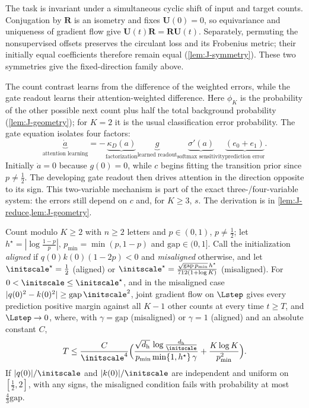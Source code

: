 The task is invariant under a simultaneous cyclic shift of input and target counts. Conjugation by $\mathbf R$ is an isometry
and fixes $\mathbf U(0)=0$, so equivariance and uniqueness of gradient flow give $\mathbf U(t)\mathbf R=\mathbf R\mathbf U(t)$.
Separately, permuting the nonsupervised offsets preserves the circulant loss and its Frobenius metric; their initially equal
coefficients therefore remain equal (\cref{lem:J-symmetry}). These two symmetries give the fixed-direction family above.

The count contrast learns from the difference of the weighted errors, while the gate readout learns their attention-weighted
difference. Here $\phi_K$ is the probability of the other possible next count plus half the total background probability
(\cref{lem:J-geometry}); for $K=2$ it is the usual classification error probability. The gate equation isolates four factors:
\[
 \boxed{\underbrace{\dot a}_{\text{attention learning}}
 =-\underbrace{\kappa_D(a)}_{\text{factorization}}
 \underbrace{g}_{\text{learned readout}}
 \underbrace{\sigma'(a)}_{\text{softmax sensitivity}}
 \underbrace{(e_0+e_1)}_{\text{prediction error}}.}
\]
Initially $\dot a=0$ because $g(0)=0$, while $c$ begins fitting the transition prior since $p\ne\frac12$. The developing gate
readout then drives attention in the direction opposite to its sign. This two-variable mechanism is part of the exact
three-/four-variable system: the errors still depend on $c$ and, for $K\ge3$, $s$. The derivation is in \cref{lem:J-reduce,lem:J-geometry}.

\begin{theorem}
\label{thm:joint}
Count modulo $K\ge2$ with $n\ge2$ letters and $p\in(0,1)$, $p\neq\tfrac{1}{2}$; let $h^\star=|\log\tfrac{1-p}{p}|$, $p_{\min}=\min(p,1-p)$ and
$\mathrm{gap}\in(0,1]$. Call the initialization \emph{aligned} if $q(0)k(0)(1-2p)<0$ and \emph{misaligned} otherwise, and let
$\initscale^\star=\tfrac{1}{2}$ (aligned) or $\initscale^\star=\frac{\sqrt{\mathrm{gap}\,p_{\min}}\,h^\star}{712(1+\log K)}$ (misaligned).
For $0<\initscale\le\initscale^\star$, and in the misaligned case $|q(0)^2-k(0)^2|\ge\mathrm{gap}\,\initscale^2$, joint gradient flow on $\Lstep$ gives
every prediction positive margin against all $K-1$ other counts at every time $t\ge T$, and $\Lstep\to0$, where, with $\gamma=\mathrm{gap}$
(misaligned) or $\gamma=1$ (aligned) and an absolute constant $C$,
\[
 T\le\frac{C}{\initscale^4}\Bigl(\frac{\sqrt{d_{\mathrm h}}\,\log\frac{d_{\mathrm h}}{\initscale}}{p_{\min}\min\{1,h^\star\}\,\gamma}+\frac{K\log K}{p_{\min}^2}\Bigr).
\]
If $|q(0)|/\initscale$ and $|k(0)|/\initscale$ are independent and uniform on $[\tfrac{1}{2},2]$, with any signs, the misaligned condition fails with
probability at most $\tfrac{4}{3}\mathrm{gap}$.
\end{theorem}

